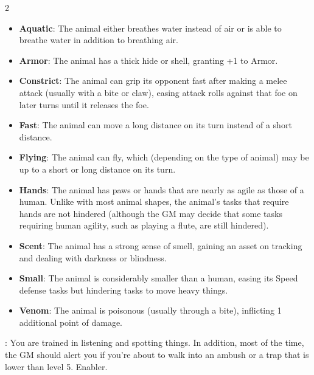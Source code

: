 \begin{multicols}{2}

\begin{itemize}

\item \textbf{Aquatic}: The animal either breathes water instead of air or is able to breathe water in addition to breathing air.

\item \textbf{Armor}: The animal has a thick hide or shell, granting +1 to Armor.

\item \textbf{Constrict}: The animal can grip its opponent fast after making a melee attack (usually with a bite or claw), easing attack rolls against that foe on later turns until it releases the foe.

\item \textbf{Fast}: The animal can move a long distance on its turn instead of a short distance.

\item \textbf{Flying}: The animal can fly, which (depending on the type of animal) may be up to a short or long distance on its turn.

\item \textbf{Hands}: The animal has paws or hands that are nearly as agile as those of a human. Unlike with most animal shapes, the animal’s tasks that require hands are not hindered (although the GM may decide that some tasks requiring human agility, such as playing a flute, are still hindered).

\item \textbf{Scent}: The animal has a strong sense of smell, gaining an asset on tracking and dealing with darkness or blindness.

\item \textbf{Small}: The animal is considerably smaller than a human, easing its Speed defense tasks but hindering tasks to move heavy things.

\item \textbf{Venom}: The animal is poisonous (usually through a bite), inflicting 1 additional point of damage.

\end{itemize}

: You are trained in listening and spotting things. In addition, most of the time, the GM should alert you if you’re about to walk into an ambush or a trap that is lower than level 5. Enabler. 


\end{multicols}
